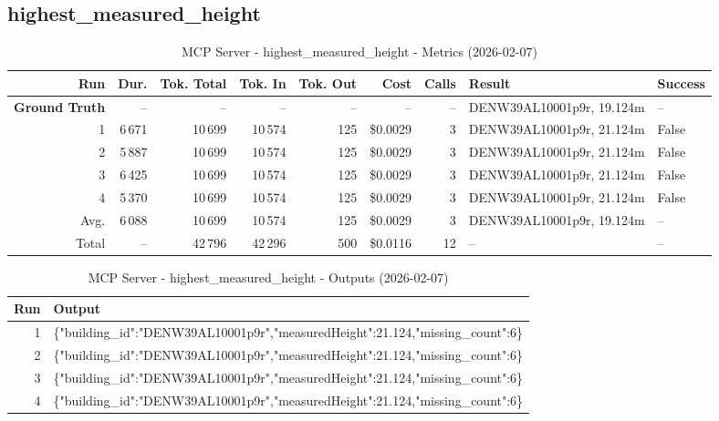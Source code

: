 \documentclass[a4paper,11pt]{article}
\begin{document}
\clearpage
\subsection{highest\_measured\_height}

\begin{table}[ht]
\centering
\scriptsize
\caption{MCP Server - highest\_measured\_height - Metrics (2026-02-07)}
\label{tab:mcp\_highest\_measured\_height\_metrics\_2026-02-07}
\begin{tabular}{r r r r r r r p{3cm} l}
\hline
Run & Dur. & Tok. Total & Tok. In & Tok. Out & Cost & Calls & Result & Success \\
\hline
\textbf{Ground Truth} & -- & -- & -- & -- & -- & -- & DENW39AL10001p9r, 19.124m & -- \\
1 & 6\,671 & 10\,699 & 10\,574 & 125 & \$0.0029 & 3 & DENW39AL10001p9r, 21.124m & False \\
2 & 5\,887 & 10\,699 & 10\,574 & 125 & \$0.0029 & 3 & DENW39AL10001p9r, 21.124m & False \\
3 & 6\,425 & 10\,699 & 10\,574 & 125 & \$0.0029 & 3 & DENW39AL10001p9r, 21.124m & False \\
4 & 5\,370 & 10\,699 & 10\,574 & 125 & \$0.0029 & 3 & DENW39AL10001p9r, 21.124m & False \\
\hline
Avg. & 6\,088 & 10\,699 & 10\,574 & 125 & \$0.0029 & 3 & DENW39AL10001p9r, 19.124m & -- \\
Total & -- & 42\,796 & 42\,296 & 500 & \$0.0116 & 12 & -- & -- \\
\hline
\end{tabular}
\end{table}

\clearpage

\begin{table}[ht]
\centering
\scriptsize
\caption{MCP Server - highest\_measured\_height - Outputs (2026-02-07)}
\label{tab:mcp\_highest\_measured\_height\_outputs\_2026-02-07}
\begin{tabular}{r p{12cm}}
\hline
Run & Output \\
\hline
1 & \{"building\_id":"DENW39AL10001p9r","measuredHeight":21.124,"missing\_count":6\} \\
2 & \{"building\_id":"DENW39AL10001p9r","measuredHeight":21.124,"missing\_count":6\} \\
3 & \{"building\_id":"DENW39AL10001p9r","measuredHeight":21.124,"missing\_count":6\} \\
4 & \{"building\_id":"DENW39AL10001p9r","measuredHeight":21.124,"missing\_count":6\} \\
\hline
\end{tabular}
\end{table}
\end{document}
